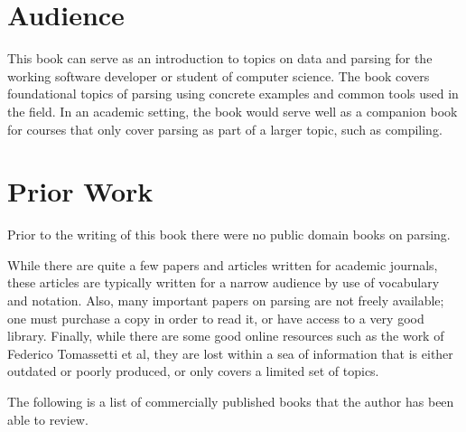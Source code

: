 \documentclass{book}
\begin{document}
\section*{Audience}
This book can serve as an introduction to topics on data and parsing for
the working software developer or student of computer science. The book
covers foundational topics of parsing using concrete examples and common
tools used in the field. In an academic setting, the book would serve well as
a companion book for courses that only cover parsing as part of a larger
topic, such as compiling.

\section*{Prior Work}
Prior to the writing of this book there were no public domain 
books on parsing.

While there are quite a few papers and articles written for academic
journals, these articles are typically written for a narrow audience 
by use of vocabulary and notation.
Also, many important papers on parsing are not freely available; one must
purchase a copy in order to read it, or have access to a very good library.
Finally, while there are some good online resources such as the work of
Federico Tomassetti et al, they are lost within a sea of information that
is either outdated or poorly produced, or only covers a limited set of topics.

The following is a list of commercially published books that the author has been 
able to review. 
\end{document}
